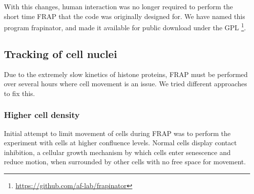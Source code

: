       With this changes, human interaction was no longer required
      to perform the short time FRAP that the code was originally
      designed for.
      We have named this program frapinator, and made it available
      for public download under the GPL \footnote{\url{https://github.com/af-lab/frapinator}}.


  \subsection{Tracking of cell nuclei}


    Due to the extremely slow kinetics of histone proteins, FRAP
    must be performed over several hours where cell movement is
    an issue. %
    We tried different approaches to fix this.

    \subsubsection{Higher cell density}

      Initial attempt to limit movement of cells during FRAP
      was to perform the experiment with cells at higher confluence levels.
      Normal cells display contact inhibition, a cellular growth mechanism
      by which cells enter senescence and reduce motion, when
      surrounded by other cells with no free space for movement.

